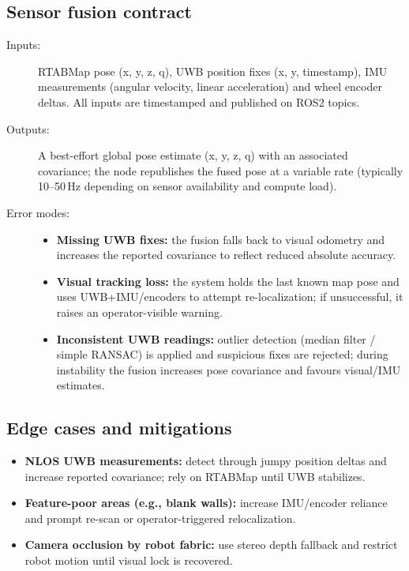 \subsection*{Sensor fusion contract}
\begin{description}
	\item[Inputs:] RTABMap pose (x, y, z, q), UWB position fixes (x, y, timestamp), IMU measurements (angular velocity, linear acceleration) and wheel encoder deltas. All inputs are timestamped and published on ROS2 topics.
	\item[Outputs:] A best-effort global pose estimate (x, y, z, q) with an associated covariance; the node republishes the fused pose at a variable rate (typically 10--50\,Hz depending on sensor availability and compute load).
	\item[Error modes:] \begin{itemize}[nosep,leftmargin=*]
		\item \textbf{Missing UWB fixes:} the fusion falls back to visual odometry and increases the reported covariance to reflect reduced absolute accuracy.
		\item \textbf{Visual tracking loss:} the system holds the last known map pose and uses UWB+IMU/encoders to attempt re-localization; if unsuccessful, it raises an operator-visible warning.
		\item \textbf{Inconsistent UWB readings:} outlier detection (median filter / simple RANSAC) is applied and suspicious fixes are rejected; during instability the fusion increases pose covariance and favours visual/IMU estimates.
	\end{itemize}
\end{description}

\subsection*{Edge cases and mitigations}
\begin{itemize}
	\item \textbf{NLOS UWB measurements:} detect through jumpy position deltas and increase reported covariance; rely on RTABMap until UWB stabilizes.
	\item \textbf{Feature-poor areas (e.g., blank walls):} increase IMU/encoder reliance and prompt re-scan or operator-triggered relocalization.
	\item \textbf{Camera occlusion by robot fabric:} use stereo depth fallback and restrict robot motion until visual lock is recovered.
\end{itemize}

